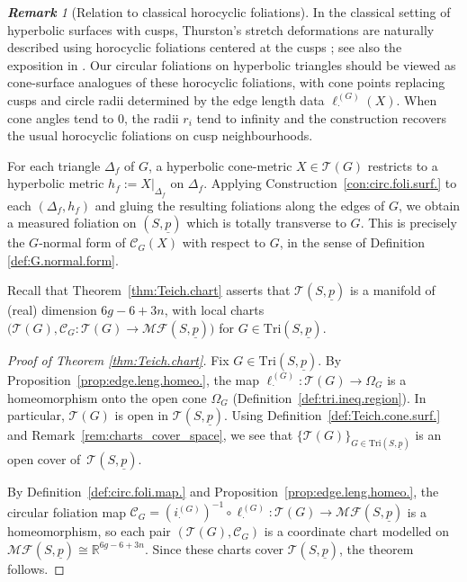\documentclass[11pt, letterpaper]{amsart}
\theoremstyle{definition}
\theoremstyle{remark}
\newtheorem{remark}[theorem]{\rm\bf Remark}
\newcommand{\up}{\underline{p}}
\newcommand{\Sp}{(S,\up)}
\newcommand{\TSp}{\text{Tri}\Sp}
\newcommand{\iG}{i^{(G)}}
\newcommand{\cMFp}{\mathcal{MF} (S,\up)}
\newcommand{\cC}{\mathcal{C}}
\newcommand{\cT}{\mathcal{T}}
\newcommand{\cTp}{\mathcal{T} (S,\up)}
\newcommand{\bR}{\mathbb{R}}
\numberwithin{equation}{section}
\begin{document}
\begin{remark}[Relation to classical horocyclic foliations]
\label{rem:circular.cusp.relation}
In the classical setting of hyperbolic surfaces with cusps, Thurston's stretch
deformations are naturally described using horocyclic foliations centered at the
cusps \cite[Sec.~4]{Thu98}; see also the exposition in \cite[Def.~3.7]{PT07}.
Our circular foliations on hyperbolic triangles should be viewed as cone-surface
analogues of these horocyclic foliations, with cone points replacing cusps and
circle radii determined by the edge length data \(\ell^{(G)}_{\cdot}(X)\).
When cone angles tend to \(0\), the radii \(r_i\) tend to infinity and the
construction recovers the usual horocyclic foliations on cusp neighbourhoods.
\end{remark}

For each triangle \(\Delta_f\) of \(G\), a hyperbolic cone-metric
\(X\in\cT(G)\) restricts to a hyperbolic metric \(h_f := X|_{\Delta_f}\) on
\(\Delta_f\).
Applying Construction~\ref{con:circ.foli.surf.} to each \((\Delta_f,h_f)\) and
gluing the resulting foliations along the edges of \(G\), we obtain a measured
foliation on \(\Sp\) which is totally transverse to \(G\).
This is precisely the $G$-normal form of \(\cC_G(X)\) with respect to \(G\), in the
sense of Definition \ref{def:G.normal.form}.

\medskip

Recall that Theorem~\ref{thm:Teich.chart} asserts that \(\cTp\) is a manifold of
(real) dimension \(6g-6+3n\), with local charts
\(\big(\cT(G),\cC_G:\cT(G)\to\cMFp\big)\) for \(G\in\TSp\).

\begin{proof}[Proof of Theorem \ref{thm:Teich.chart}]
Fix \(G \in \TSp\).
By Proposition~\ref{prop:edge.leng.homeo.}, the map
\(\ell^{(G)}_{\cdot}: \cT(G)\to\Omega_G\) is a homeomorphism onto the open cone
\(\Omega_G\) (Definition~\ref{def:tri.ineq.region}).
In particular, \(\cT(G)\) is open in \(\cTp\).
Using Definition~\ref{def:Teich.cone.surf.} and
Remark~\ref{rem:charts_cover_space}, we see that
\(\{\cT(G)\}_{G\in\TSp}\) is an open cover of~\(\cTp\).

By Definition~\ref{def:circ.foli.map.} and
Proposition~\ref{prop:edge.leng.homeo.}, the circular foliation map
\(\cC_G = (\iG_{\cdot})^{-1}\circ \ell^{(G)}_{\cdot}: \cT(G)\to\cMFp\) is a
homeomorphism, so each pair \((\cT(G),\cC_G)\) is a coordinate chart modelled on
\(\cMFp\cong\bR^{6g-6+3n}\).
Since these charts cover \(\cTp\), the theorem follows.
\end{proof}
\end{document}
